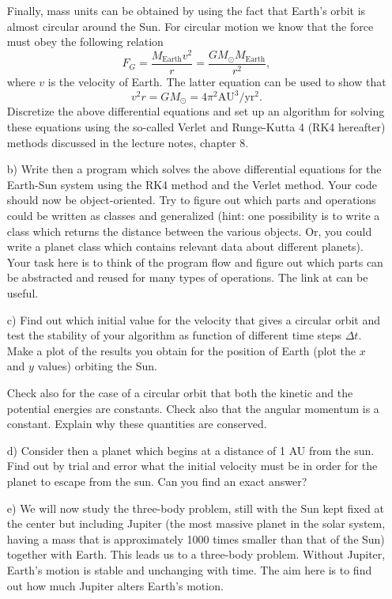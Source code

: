 \documentclass[a4wide,12pt]{article}
\begin{document}
\begin{enumerate}
Finally,  mass units can be obtained by using the fact that Earth's orbit is almost circular around the Sun.
For circular motion we know that the force must obey the following relation
\[
F_G= \frac{M_{\mathrm{Earth}}v^2}{r}=\frac{GM_{\odot}M_{\mathrm{Earth}}}{r^2},
\]
where $v$ is the velocity of Earth. 
The latter equation can be used to show that
\[
v^2r=GM_{\odot}=4\pi^2\mathrm{AU}^3/\mathrm{yr}^2.
\]
Discretize the above differential equations and set up an algorithm for solving these equations using the so-called Verlet and
Runge-Kutta 4 (RK4 hereafter)  methods discussed in the lecture notes, chapter 8.
\item[b)]  Write then a program which solves the above differential equations for the Earth-Sun system
using the RK4 method and the Verlet method. 
Your code should now be object-oriented. Try to figure out which parts and operations could be written as classes
and generalized (hint: one possibility is to write a class which returns the distance between the various objects. Or, you could write a planet class which contains relevant data about different planets).  Your task here is to think of the program flow and figure out which parts can be abstracted and reused for many types of operations. The link at \url{} can be useful. 
\item[c)]
Find out which initial value for the velocity that gives a circular orbit
and test the stability of your algorithm as function of different time steps $\Delta t$. 
Make a plot of the results you obtain for the position of Earth (plot the $x$ and $y$ values) orbiting  the Sun.

Check also for the case of a circular orbit that both the kinetic and the potential energies are constants.
Check also that the angular momentum is a constant. Explain why these quantities
are conserved.


\item[d)] Consider then a planet which begins at a distance of 1 AU from the sun. Find out by trial and error
what the initial velocity must be in order for the planet to escape from the sun.  Can you find an exact answer?

\item[e)]  We will now study the three-body problem, still with the Sun kept fixed at the center but 
including Jupiter (the most massive planet in the solar system, having a mass that is approximately 1000 times
smaller than that of the Sun) together with Earth. This leads us to a three-body problem. Without Jupiter, Earth's motion is stable and unchanging with time. The aim here is to find out how much Jupiter alters Earth's motion.


\end{enumerate}
\end{document}
